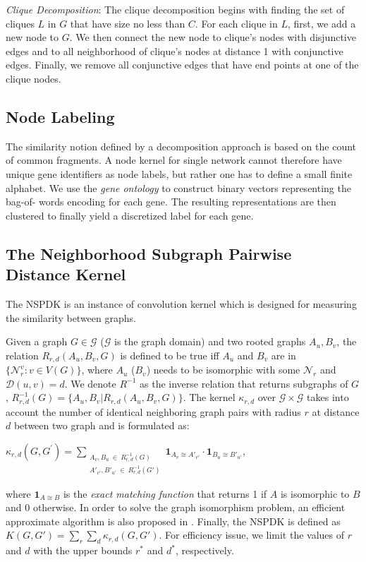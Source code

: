 \documentclass{esannV2}
\begin{document}
\textit{Clique Decomposition}: The clique decomposition begins with finding the set of cliques $L$ in $G$ that have size no less than $C$. For each clique in $L$, first, we add a new node to $G$. We then connect the new node to clique's nodes with disjunctive edges and to all neighborhood of clique's nodes at distance 1 with conjunctive edges. Finally, we remove all conjunctive edges that have end points at one of the clique nodes.

\subsection{Node Labeling} The similarity notion defined by a decomposition
approach is based on the count of common fragments. A node kernel for single
network cannot therefore have unique gene identifiers as node labels, but
rather one has to define a small finite alphabet. We use the \textit{gene
ontology} \cite{ontology} to construct binary vectors representing the bag-of-
words encoding for each gene. The resulting representations are then clustered
to finally yield a discretized label for each gene.

\subsection{The Neighborhood Subgraph Pairwise Distance Kernel}
The NSPDK is an instance of convolution kernel which is designed for measuring the similarity between graphs.

Given a graph $G \in \mathcal{G}$ ($\mathcal{G}$ is the graph domain) and two rooted graphs $A_u, B_v$, the relation $R_{r,d}(A_u, B_v, G)$ is defined to be true iff $A_u$ and $B_v$ are in $\lbrace \mathcal{N}_r^v: v \in V(G) \rbrace$, where $A_u$ ($B_v$) needs to be isomorphic with some $\mathcal{N}_r$ and $\mathcal{D}(u,v)= d$. We denote $R^{-1}$ as the inverse relation that returns subgraphs of $G$, $R^{-1}_{r,d}(G) = \lbrace A_u, B_v | R_{r,d}(A_u,B_v,G)\rbrace$. The kernel $\kappa_{r,d}$ over $\mathcal{G} \times \mathcal{G}$ takes into account the number of identical neighboring graph pairs with radius $r$ at distance $d$ between two graph and is formulated as:
\begin{center}
 $\kappa_{r,d}(G,G^{'}) = \!\!\!\!\!\!\!\!\!\!\!\! \sum\limits_{\substack{A_v, B_u \ \in \ R_{r,d}^{-1}(G) \\ {A'}_{v'}, {B'}_{u'} \ \in \ R_{r,d}^{-1}(G') }} \!\!\!\!\!\!\!\!\!\!\!\!
 { { \textbf{1}_{A_{v} \cong A'_{v'}}} \cdot { \textbf{1}_{B_{u} \cong B'_{u'}}}  }$,
\end{center}
where $\textbf{1}_{A \cong B}$ is the \textit{exact matching function} that returns 1 if $A$ is isomorphic to $B$ and 0 otherwise. In order to solve the graph isomorphism problem, an efficient approximate algorithm is also proposed in \cite{nspdk}. Finally, the NSPDK is defined as $K(G,G') = \sum\limits_{r}{\sum\limits_{d}{\kappa_{r,d}(G,G')}}$. For efficiency issue, we limit the values of $r$ and $d$ with the upper bounds $r^*$ and $d^*$, respectively.
\end{document}
